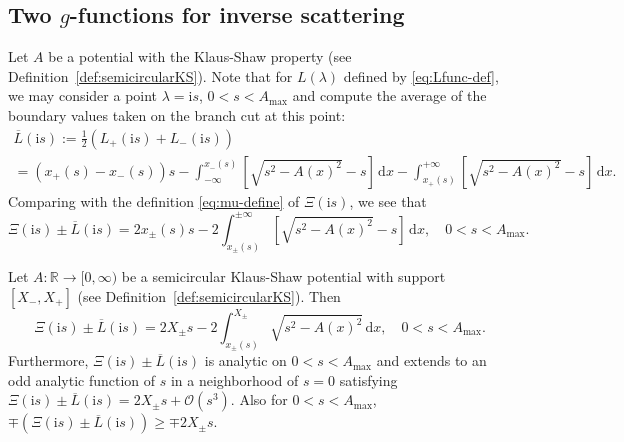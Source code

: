 \documentclass[12pt]{amsart}
\numberwithin{equation}{section}
\newcommand{\dd}{\mathrm{d}}
\newcommand{\ii}{\mathrm{i}}
\newcommand{\SP}{\lambda}
\newcommand{\tailint}{\Xi}
\newcommand{\R}{\mathbb{R}}
\newcommand{\bigo}[1]{ \mathcal{O}\! \left( #1 \right) }
\begin{document}
\subsection{Two $g$-functions for inverse scattering}
\label{sec:ZS-g}
Let $A$ be a potential with the Klaus-Shaw property (see Definition~\ref{def:semicircularKS}).
Note that for $L(\SP)$ defined by \eqref{eq:Lfunc-def}, we may consider a point $\SP=\ii s$, $0<s<A_\mathrm{max}$ and compute the average of the boundary values taken on the branch cut at this point:
\begin{multline}
\overline{L}(\ii s):=\frac{1}{2}\left(L_+(\ii s)+L_-(\ii s)\right) \\
= (x_+(s)-x_-(s))s - \int_{-\infty}^{x_-(s)}
\left[\sqrt{s^2-A(x)^2}-s\right]\,\dd x - \int_{x_+(s)}^{+\infty}\left[\sqrt{s^2-A(x)^2}-s\right]\,\dd x.
\label{eq:Lbar-def-1}
\end{multline}
Comparing with the definition \eqref{eq:mu-define} of $\tailint(\ii s)$, we see that
\begin{equation}
\tailint(\ii s)\pm\overline{L}(\ii s)=2x_\pm(s)s-2\int_{x_\pm(s)}^{\pm\infty}\left[\sqrt{s^2-A(x)^2}-s\right]\,\dd x,\quad 0<s<A_\mathrm{max}.
\label{eq:mu-plus-Lbar}
\end{equation}
\begin{lem}
Let $A:\R \to [0,\infty)$ be a semicircular Klaus-Shaw potential with support $[X_-,X_+]$ (see Definition~\ref{def:semicircularKS}).  Then 
\begin{equation}
\tailint(\ii s)\pm\overline{L}(\ii s)=2X_\pm s - 2\int_{x_\pm(s)}^{X_\pm}\sqrt{s^2-A(x)^2}\,\dd x,\quad 0<s<A_\mathrm{max}.
\label{eq:mu-plus-Lbar-cpt}
\end{equation}
Furthermore, $\tailint(\ii s)\pm\overline{L}(\ii s)$ is analytic on $0<s<A_\mathrm{max}$ and extends to an odd analytic function of $s$ in a neighborhood of $s=0$ satisfying $\tailint(\ii s)\pm\overline{L}(\ii s)=2X_\pm s + \bigo{s^3}$.  Also for $0<s<A_\mathrm{max}$, $\mp(\tailint(\ii s)\pm\overline{L}(\ii s))\ge \mp 2X_\pm s$.
\label{lem:mu-Lbar}
\end{lem}
\end{document}
